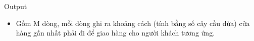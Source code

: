 Output  
\begin{itemize}
	\item     Gồm M dòng, mỗi dòng ghi ra khoảng cách (tính bằng số cây cầu dừa) cửa hàng gần nhất phải đi để giao hàng cho người khách tương ứng.   
\end{itemize}